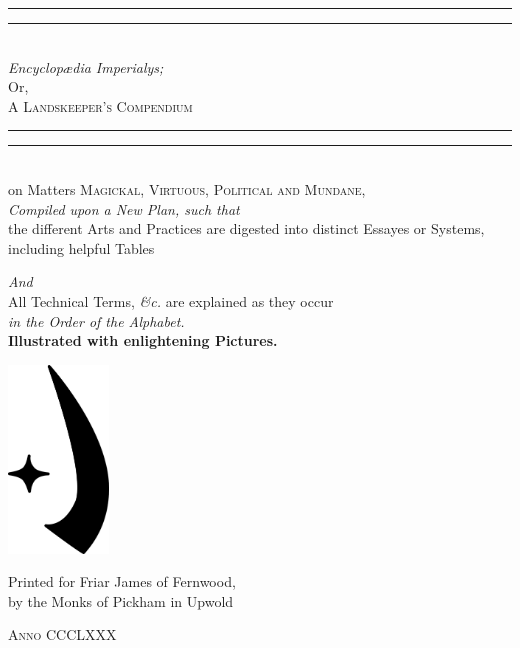\documentclass[twoside,fontsize=9pt,a5paper]{scrbook}
\begin{document}
\pagestyle{plain}

\begin{titlepage}
 \centering
 \vspace*{\baselineskip}
 \rule{\textwidth}{1.4pt}\vspace*{-\baselineskip}\vspace*{2pt}
 \rule{\textwidth}{0.3pt}\\[\baselineskip]
 
 {\Huge \itshape Encyclopædia Imperialys;}\\[0.4em]
 {\Large Or,\\[0.4em]}
 {\huge\scshape A Landskeeper's Compendium}\\
 \rule{\textwidth}{0.4pt}\vspace*{-\baselineskip}\vspace{3.2pt}
 \rule{\textwidth}{1.6pt}\\[\baselineskip]
 {\Large on Matters \scshape Magickal, Virtuous, Political {\normalfont and} Mundane,\\[0.9em]}
 {\itshape Compiled upon a New Plan, such that\\[0.5em]}
 {\large the different Arts and Practices are digested into distinct Essayes or Systems, including helpful Tables}
 
 {\itshape And\\[0.5em]}
 {\large All Technical Terms, \textit{\&c.} are explained as they occur \\[0.5em] \itshape in the Order of the Alphabet.}
 \\[0.9em]
 {\bfseries Illustrated with enlightening Pictures.}
 
 \vfill
 
 \includegraphics[height=5cm]{encyclopedia/Sular.pdf}

 \vfill

 Printed for Friar James of Fernwood,\\[0.4em]
 by the Monks of Pickham in Upwold
 
 {\scshape Anno CCCLXXX}
\end{titlepage}
\end{document}

